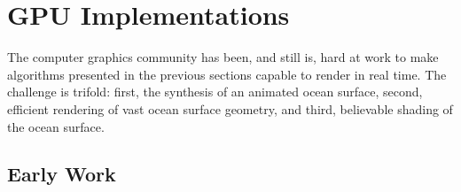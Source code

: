 \section{GPU Implementations}
%
The computer graphics community has been, and still is, hard at work to make
algorithms presented in the previous sections capable to render in real time.
The challenge is trifold: first, the synthesis of an animated ocean surface,
second, efficient rendering of vast ocean surface geometry, and third,
believable shading of the ocean surface.
%
\subsection{Early Work}
%
\begin{figure}
 \centering
 \hfill
\end{figure}

